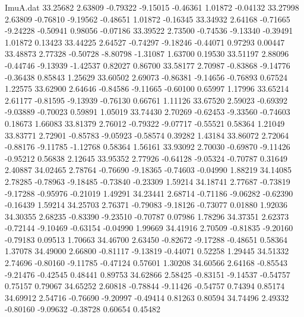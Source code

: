 \begin{filecontents}{ImuA.dat}
  33.25682    2.63809   -0.79322   -9.15015   -0.46361    1.01872   -0.04132
  33.27998    2.63809   -0.76810   -9.19562   -0.48651    1.01872   -0.16345
  33.34932    2.64168   -0.71665   -9.24228   -0.50941    0.98056   -0.07186
  33.39522    2.73500   -0.74536   -9.13340   -0.39491    1.01872    0.13423
  33.44225    2.64527   -0.74297   -9.18246   -0.44071    0.97293    0.00447
  33.48873    2.77328   -0.50728   -8.80798   -1.31087    1.63700    0.19530
  33.51197    2.88096   -0.44746   -9.13939   -1.42537    0.82027    0.86700
  33.58177    2.70987   -0.83868   -9.14776   -0.36438    0.85843    1.25629
  33.60502    2.69073   -0.86381   -9.14656   -0.76893    0.67524    1.22575
  33.62900    2.64646   -0.84586   -9.11665   -0.60100    0.65997    1.17996
  33.65214    2.61177   -0.81595   -9.13939   -0.76130    0.66761    1.11126
  33.67520    2.59023   -0.69392   -9.03889   -0.70023    0.59891    1.05019
  33.74430    2.70269   -0.62453   -9.33560   -0.74603    0.18673    1.66083
  33.81379    2.76012   -0.79322   -9.07717   -0.55521    0.58364    1.21049
  33.83771    2.72901   -0.85783   -9.05923   -0.58574    0.39282    1.43184
  33.86072    2.72064   -0.88176   -9.11785   -1.12768    0.58364    1.56161
  33.93092    2.70030   -0.69870   -9.11426   -0.95212    0.56838    2.12645
  33.95352    2.77926   -0.64128   -9.05324   -0.70787    0.31649    2.40887
  34.02465    2.78764   -0.76690   -9.18365   -0.74603   -0.04990    1.88219
  34.14085    2.78285   -0.78963   -9.18485   -0.73840   -0.23309    1.59214
  34.18741    2.77687   -0.73819   -9.17288   -0.95976   -0.21019    1.49291
  34.23441    2.68714   -0.71186   -9.06282   -0.62390   -0.16439    1.59214
  34.25703    2.76371   -0.79083   -9.18126   -0.73077    0.01880    1.92036
  34.30355    2.68235   -0.83390   -9.23510   -0.70787    0.07986    1.78296
  34.37351    2.62373   -0.72144   -9.10469   -0.63154   -0.04990    1.99669
  34.41916    2.70509   -0.81835   -9.20160   -0.79183    0.09513    1.70663
  34.46700    2.63450   -0.82672   -9.17288   -0.48651    0.58364    1.37078
  34.49000    2.66800   -0.81117   -9.13819   -0.44071    0.52258    1.29445
  34.51332    2.74696   -0.80160   -9.11785   -0.47124    0.57601    1.30208
  34.60566    2.64168   -0.85543   -9.21476   -0.42545    0.48441    0.89753
  34.62866    2.58425   -0.83151   -9.14537   -0.54757    0.75157    0.79067
  34.65252    2.60818   -0.78844   -9.11426   -0.54757    0.74394    0.85174
  34.69912    2.54716   -0.76690   -9.20997   -0.49414    0.81263    0.80594
  34.74496    2.49332   -0.80160   -9.09632   -0.38728    0.60654    0.45482

\end{filecontents}
